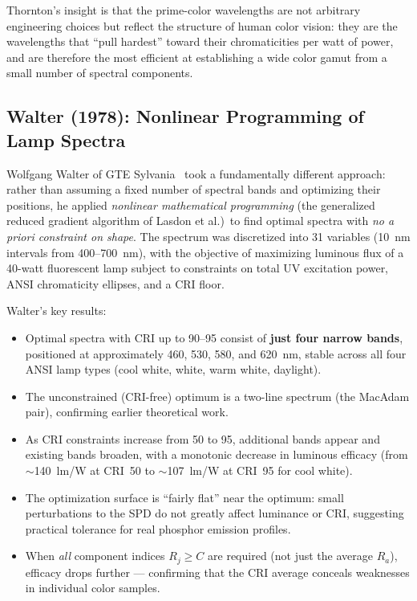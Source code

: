 \documentclass[11pt]{article}
\begin{document}
Thornton's insight is that the prime-color wavelengths are not arbitrary
engineering choices but reflect the structure of human color vision: they
are the wavelengths that ``pull hardest'' toward their chromaticities per
watt of power, and are therefore the most efficient at establishing a
wide color gamut from a small number of spectral components.

\subsection{Walter (1978): Nonlinear Programming of Lamp Spectra}

Wolfgang Walter of GTE Sylvania~\cite{walter1978} took a fundamentally
different approach: rather than assuming a fixed number of spectral bands
and optimizing their positions, he applied \emph{nonlinear mathematical
programming} (the generalized reduced gradient algorithm of Lasdon et
al.)\ to find optimal spectra with \emph{no a priori constraint on shape}.
The spectrum was discretized into 31 variables (10~nm intervals from
400--700~nm), with the objective of maximizing luminous flux of a
40-watt fluorescent lamp subject to constraints on total UV excitation
power, ANSI chromaticity ellipses, and a CRI floor.

Walter's key results:
\begin{itemize}
\item Optimal spectra with CRI up to 90--95 consist of \textbf{just four
  narrow bands}, positioned at approximately 460, 530, 580, and 620~nm,
  stable across all four ANSI lamp types (cool white, white, warm white,
  daylight).
\item The unconstrained (CRI-free) optimum is a two-line spectrum (the
  MacAdam pair), confirming earlier theoretical work.
\item As CRI constraints increase from 50 to 95, additional bands
  appear and existing bands broaden, with a monotonic decrease in
  luminous efficacy (from $\sim$140~lm/W at CRI~50 to $\sim$107~lm/W at
  CRI~95 for cool white).
\item The optimization surface is ``fairly flat'' near the optimum:
  small perturbations to the SPD do not greatly affect luminance or CRI,
  suggesting practical tolerance for real phosphor emission profiles.
\item When \emph{all} component indices $R_j \geq C$ are required (not just
  the average $R_a$), efficacy drops further --- confirming that the CRI
  average conceals weaknesses in individual color samples.
\end{itemize}
\end{document}
